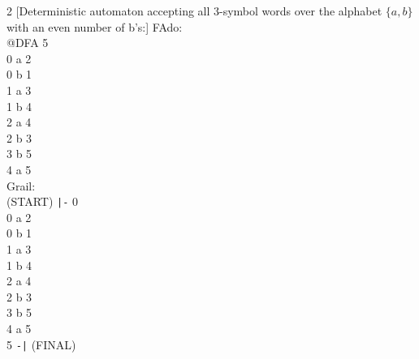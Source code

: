 \documentclass{article}
\begin{document}
\pagebreak

\begin{center}
\raggedright
\begin{multicols}{2}
[Deterministic automaton accepting all 3-symbol words over the alphabet $\{a, b\}$ with an even number of b's:]
FAdo:\\
@DFA 5\\0 a 2\\0 b 1\\1 a 3\\1 b 4\\2 a 4\\2 b 3\\3 b 5\\4 a 5\\
\columnbreak
Grail:\\
(START) \verb=|-= 0\\0 a 2\\0 b 1\\1 a 3\\1 b 4\\2 a 4\\2 b 3\\3 b 5\\4 a 5\\5 \verb=-|= (FINAL)\\
\end{multicols}
\end{center}
\end{document}
